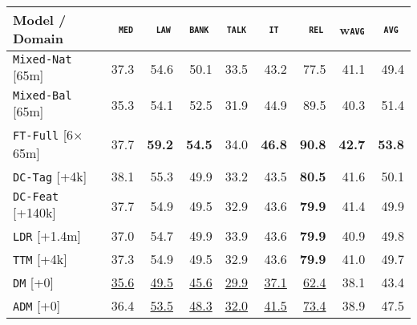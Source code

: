 \documentclass[11pt,a4paper]{article}
\newcommand{\fyDone}[1]{\done[FY]\Todo[FY:]{\textcolor{orange}{#1}}}
\newcommand{\domain}[1]{\texttt{\textsc{#1}}}
\newcommand{\system}[1]{\texttt{{#1}}}
\newcommand{\SB}[1]{\textbf{#1}}
\newcommand{\SW}[1]{\underline{#1}}
\begin{document}
\begin{table*}
  \centering
  \fyDone{Fix column size}
  \begin{tabular}{|p{3cm}|*{8}{r|}} \hline
    Model / Domain & \multicolumn{1}{c|}{\domain{ med}} & \multicolumn{1}{c|}{\domain{ law}} & \multicolumn{1}{c|}{\domain{bank}} & \multicolumn{1}{c|}{\domain{talk}} & \multicolumn{1}{c|}{\domain{ it }} & \multicolumn{1}{c|}{\domain{ rel}} & \multicolumn{1}{c|}{w\domain{avg}} & \multicolumn{1}{c|}{\domain{avg}} \\ \hline %
    \system{Mixed-Nat}  \hfill{\footnotesize[65m]} & 37.3 & 54.6 & 50.1 & 33.5 & 43.2 & 77.5  & 41.1  & 49.4 \\%
    \system{Mixed-Bal}   \hfill{\footnotesize[65m]} &  35.3 & 54.1 & 52.5 & 31.9 & 44.9 & 89.5 & 40.3  & 51.4 \\ %
    \system{FT-Full}       \hfill{\footnotesize[6$\times$65m]} & 37.7 & \SB{59.2} & \SB{54.5} & 34.0 & \SB{46.8} & \SB{90.8}   & \SB{42.7} & \SB{53.8} \\ \hline
    \system{DC-Tag} \hfill{\footnotesize[+4k]}        & 38.1 & 55.3 & 49.9   & 33.2 & 43.5 & \SB{80.5} &41.6 & 50.1    \\%
    \system{DC-Feat} \hfill{\footnotesize[+140k]}    & 37.7  & 54.9 & 49.5   & 32.9 & 43.6 & \SB{79.9} &41.4 & 49.9   \\%
    \system{LDR}       \hfill{\footnotesize[+1.4m]}    & 37.0   & 54.7 & 49.9 & 33.9 & 43.6 & \SB{79.9} &40.9 & 49.8          \\%
    \system{TTM}      \hfill{\footnotesize[+4k]}        & 37.3 & 54.9 & 49.5 & 32.9 & 43.6 & \SB{79.9} &41.0 & 49.7     \\%
    \system{DM}        \hfill{\footnotesize[+0]}         & \SW{35.6} & \SW{49.5}  & \SW{45.6}& \SW{29.9} & \SW{37.1} & \SW{62.4} & 38.1 & 43.4 \\ %
    \system{ADM}      \hfill{\footnotesize[+0]}         & 36.4 & \SW{53.5}  & \SW{48.3} & \SW{32.0} & \SW{41.5} & \SW{73.4} & 38.9 & 47.5 \\%

\end{tabular}
\end{table*}
\end{document}
